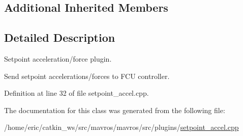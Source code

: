 \subsection*{Additional Inherited Members}


\subsection{Detailed Description}
Setpoint acceleration/force plugin. 

Send setpoint accelerations/forces to F\+CU controller. 

Definition at line 32 of file setpoint\+\_\+accel.\+cpp.



The documentation for this class was generated from the following file\+:\begin{DoxyCompactItemize}
\item 
/home/eric/catkin\+\_\+ws/src/mavros/mavros/src/plugins/\mbox{\hyperlink{setpoint__accel_8cpp}{setpoint\+\_\+accel.\+cpp}}\end{DoxyCompactItemize}
